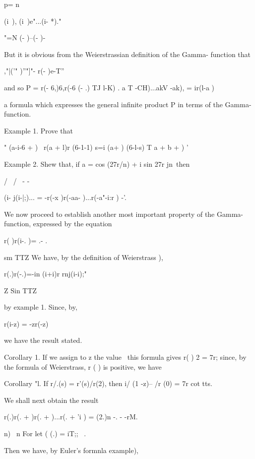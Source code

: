 p= n

(i\ ), (i\ )e"...(i- *)."

"=N (- )--(- )-

But it is obvious from the Weierstrassian definition of the Gamma-
function that

,"|('" )''"]"- r(- )e-T''

and so P = r(- 6,)6,r(-6 (- .) TJ l-K) . a T -CH)...akV -ak), =
ir(l-a )

a formula which expresses the general infinite product P in terms of
the Gamma-function.

Example 1. Prove that

 " (a-i-6 + ) \ r(a + l)r (6-1-1) s=i (a+ ) (6-l-s) T a + b + ) '

Example 2. Shew that, if a = cos (27r/n) + i sin 27r jn\ then

/ \ / \ - -

 (i- j(i-|;)... = -r(-x )r(-aa- )...r(-a"-i:r ) -'.


We now proceed to establish another most important property of the
Gamma-function, expressed by the equation

r( )r(i-. )= .- .

sm TTZ We have, by the definition of Weierstrass ),

r(.)r(-.)=-in (i+i)r rnj(i-i);"

Z Sin TTZ

by example 1. Since, by,

r(i-z) = -zr(-z)

we have the result stated.

%
%

Corollary 1. If we assign to z the value \, this formula gives r( ) 2
= 7r; since, by the formula of Weierstrass, r ( ) is positive, we
have

Corollary "l. If r/.(s) = r'(s)/r(2), then i/ (1 -z)-- /r (0) = 7r cot
tts.

We shall next obtain the result

r(.)r(. + )r(. + )...r(. + 'i ) = (2.)n -. - -rM.

n) \ n For let ( (.) = iT;; \ .

Then we have, by Euler's formnla  example),

